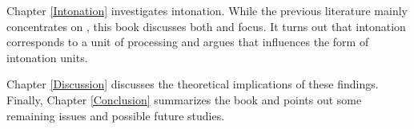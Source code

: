 \begin{refsection}
\newpage 
Chapter \ref{Intonation} investigates intonation.
While the previous literature mainly concentrates on ,
this book discusses both  and focus.
It turns out that intonation corresponds to a unit of processing and
argues that  influences the form of intonation units.

Chapter \ref{Discussion} discusses the theoretical implications of these findings.
Finally, Chapter \ref{Conclusion} summarizes the book
and points out some remaining issues and possible future studies.

\end{refsection}
